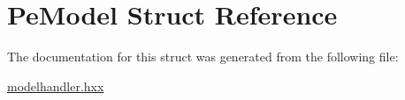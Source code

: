 \hypertarget{structPeModel}{\section{Pe\-Model Struct Reference}
\label{structPeModel}
}


The documentation for this struct was generated from the following file\-:\begin{DoxyCompactItemize}
\item 
\hyperlink{modelhandler_8hxx}{modelhandler.\-hxx}\end{DoxyCompactItemize}

